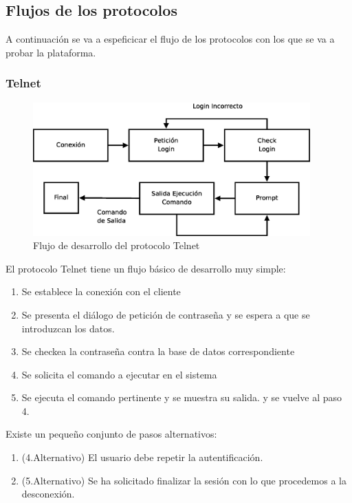 \documentclass[a4paper,spanish,12pt]{book}
\begin{document}
\subsection{Flujos de los protocolos}
A continuación se va a espeficicar el flujo de los protocolos con los que se va a probar la plataforma.

\subsubsection{Telnet}
\begin{figure}[h]
	\includegraphics[width=0.95\textwidth]{img/DiagramaFlujoTelnet.eps}
              \caption{Flujo de desarrollo del protocolo Telnet}
  \label{fig:DiagramaFlujoTelnet}
\end{figure}

El protocolo Telnet tiene un flujo básico de desarrollo muy simple:
\begin{enumerate}
	\item Se establece la conexión con el cliente
	\item Se presenta el diálogo de petición de contraseña y se espera a que se introduzcan los datos.
	\item Se checkea la contraseña contra la base de datos correspondiente
	\item Se solicita el comando a ejecutar en el sistema
	\item Se ejecuta el comando pertinente y se muestra su salida. y se vuelve al paso 4.
\end{enumerate}
Existe un pequeño conjunto de pasos alternativos:
\begin{enumerate}
	\item (4.Alternativo) El usuario debe repetir la autentificación.
	\item (5.Alternativo) Se ha solicitado finalizar la sesión con lo que procedemos a la desconexión.
\end{enumerate}
\end{document}
